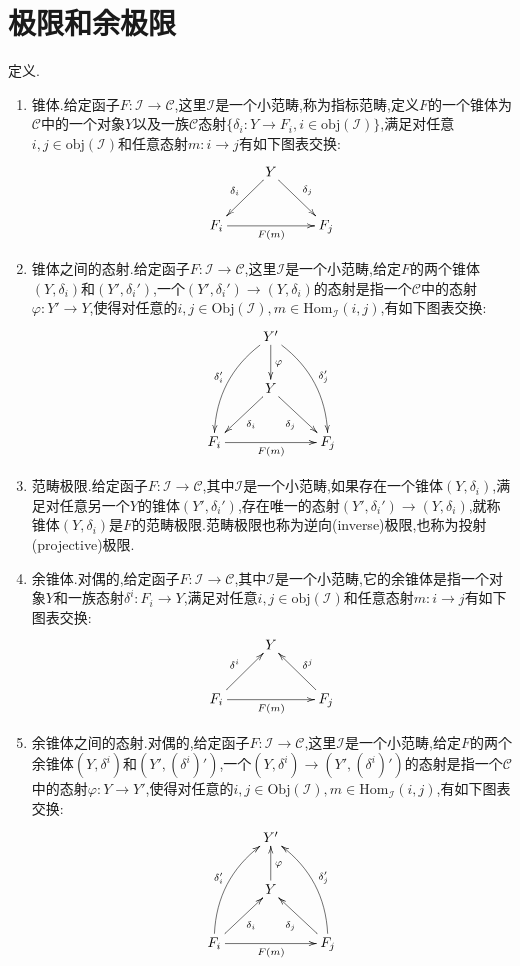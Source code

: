 \section{极限和余极限}

定义.
\begin{enumerate}
	\item 锥体.给定函子$F:\mathscr{I}\to\mathscr{C}$,这里$\mathscr{I}$是一个小范畴,称为指标范畴,定义$F$的一个锥体为$\mathscr{C}$中的一个对象$Y$以及一族$\mathscr{C}$态射$\{\delta_i:Y\to F_i,i\in \mathrm{obj}(\mathscr{I})\}$,满足对任意$i,j\in\mathrm{obj}(\mathscr{I})$和任意态射$m:i\to j$有如下图表交换:
	$$\xymatrix{&Y\ar[dl]_{\delta_i}\ar[dr]^{\delta_j}&\\F_i\ar[rr]_{F(m)}&&F_j}$$
	\item 锥体之间的态射.给定函子$F:\mathscr{I}\to\mathscr{C}$,这里$\mathscr{I}$是一个小范畴,给定$F$的两个锥体$(Y,\delta_i)$和$(Y',\delta_i')$,一个$(Y',\delta_i')\to(Y,\delta_i)$的态射是指一个$\mathscr{C}$中的态射$\varphi:Y'\to Y$,使得对任意的$i,j\in\mathrm{Obj}(\mathscr{I}),m\in\mathrm{Hom}_{\mathscr{I}}(i,j)$,有如下图表交换:
	$$\xymatrix{&Y'\ar@/_1pc/[ddl]_{\delta_i'}\ar@/^1pc/[ddr]^{\delta_j'}\ar[d]^{\varphi}&\\&Y\ar[dl]^{\delta_i}\ar[dr]_{\delta_j}&\\F_i\ar[rr]_{F(m)}&&F_j}$$
	\item 范畴极限.给定函子$F:\mathscr{I}\to\mathscr{C}$,其中$\mathscr{I}$是一个小范畴,如果存在一个锥体$(Y,\delta_i)$,满足对任意另一个$Y$的锥体$(Y',\delta_i')$,存在唯一的态射$(Y',\delta_i')\to(Y,\delta_i)$,就称锥体$(Y,\delta_i)$是$F$的范畴极限.范畴极限也称为逆向(inverse)极限,也称为投射(projective)极限.
	\item 余锥体.对偶的,给定函子$F:\mathscr{I}\to\mathscr{C}$,其中$\mathscr{I}$是一个小范畴,它的余锥体是指一个对象$Y$和一族态射$\delta^i:F_i\to Y$,满足对任意$i,j\in\mathrm{obj}(\mathscr{I})$和任意态射$m:i\to j$有如下图表交换:
    $$\xymatrix{&Y&\\F_i\ar[ur]^{\delta^i}\ar[rr]_{F(m)}&&F_j\ar[ul]_{\delta^j}}$$
    \item 余锥体之间的态射.对偶的,给定函子$F:\mathscr{I}\to\mathscr{C}$,这里$\mathscr{I}$是一个小范畴,给定$F$的两个余锥体$(Y,\delta^i)$和$(Y',(\delta^i)')$,一个$(Y,\delta^i)\to(Y',(\delta^i)')$的态射是指一个$\mathscr{C}$中的态射$\varphi:Y\to Y'$,使得对任意的$i,j\in\mathrm{Obj}(\mathscr{I}),m\in\mathrm{Hom}_{\mathscr{I}}(i,j)$,有如下图表交换:
	$$\xymatrix{&Y'&\\&Y\ar[u]_{\varphi}&\\F_i\ar[ur]_{\delta_i}\ar@/^1pc/[uur]^{\delta_i'}\ar[rr]_{F(m)}&&F_j\ar[ul]^{\delta_j}\ar@/_1pc/[uul]_{\delta_j'}}$$

\end{enumerate}
